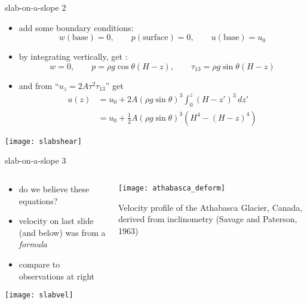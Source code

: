 \begin{frame}{slab-on-a-slope 2}

\begin{itemize}
\item add some boundary conditions:
	$$w(\text{base})=0, \qquad p(\text{surface})=0, \qquad u(\text{base})=u_0$$
\item by integrating vertically, get :
  $$w=0, \qquad p = \rho g \cos\theta (H-z), \qquad \tau_{13} = \rho g \sin\theta (H-z)$$
\item and from ``$u_z = 2 A \tau^2 \tau_{13}$'' get
\vspace{-0.05in}
\begin{align*}
u(z) &= u_0 + 2 A (\rho g \sin\theta)^3 \int_0^z (H-z')^3\,dz' \\
     &= u_0 + \frac{1}{2} A (\rho g \sin\theta)^3  \left(H^4 - (H-z)^4\right)
\end{align*}
\end{itemize}

\begin{center}
\texttt{[image: slabshear]}
\end{center}
\end{frame}


\begin{frame}{slab-on-a-slope 3}

\begin{columns}
\begin{column}{0.6\textwidth}
\begin{itemize}
\item do we believe these equations?
\item velocity on last slide (and below) was from a \emph{formula}
\item compare to observations at right
\end{itemize}
\begin{center}
\texttt{[image: slabvel]}
\end{center}
\end{column}

\begin{column}{0.4\textwidth}
\texttt{[image: athabasca\_deform]}

\medskip
\scriptsize
Velocity profile of the Athabasca Glacier, Canada, derived from inclinometry (Savage and Paterson, 1963)\nocite{SavagePaterson}
\end{column}
\end{columns}
\end{frame}


